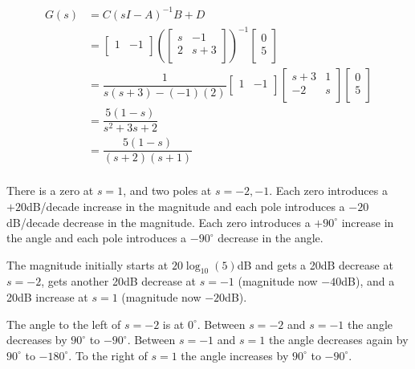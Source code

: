 \documentclass[11pt]{article}
\begin{document}
\begin{align*}
    G(s) &= C(sI - A)^{-1}B + D \\
    & = \begin{bmatrix}
        1 & -1 \\
    \end{bmatrix}
    \left(
        \begin{bmatrix}
            s & -1 \\
            2 & s + 3 \\
        \end{bmatrix}
    \right)^{-1}
    \begin{bmatrix}
        0 \\
        5 \\
    \end{bmatrix}
    \\
    &=
    \dfrac{1}{s(s + 3) - (-1)(2)}
    \begin{bmatrix}
        1 & -1 \\
    \end{bmatrix}
    \begin{bmatrix}
        s + 3 & 1 \\
        -2 & s \\
    \end{bmatrix}
    \begin{bmatrix}
        0 \\
        5 \\
    \end{bmatrix}
    \\
    &= \dfrac{5(1 - s)}{s^2 + 3s + 2} \\
    &= \dfrac{5(1 - s)}{(s + 2)(s + 1)} \\
\end{align*}

There is a zero at $s = 1$, and two poles at $s = -2, -1$. Each zero introduces a $+20$dB/decade increase in the magnitude and each pole introduces a $-20$dB/decade decrease in the magnitude. Each zero introduces a $+90^\circ$ increase in the angle and each pole introduces a $-90^\circ$ decrease in the angle.

The magnitude initially starts at $20 \log_{10}(5)$dB and gets a 20dB decrease at $s = -2$, gets another 20dB decrease at $s = -1$ (magnitude now $-40$dB), and a 20dB increase at $s = 1$ (magnitude now $-20$dB).

The angle to the left of $s = -2$ is at $0^\circ$. Between $s = -2$ and $s = -1$ the angle decreases by $90^\circ$ to $-90^\circ$. Between $s = -1$ and $s = 1$ the angle decreases again by $90^\circ$ to $-180^\circ$. To the right of $s = 1$ the angle increases by $90^\circ$ to $-90^\circ$.
\end{document}
